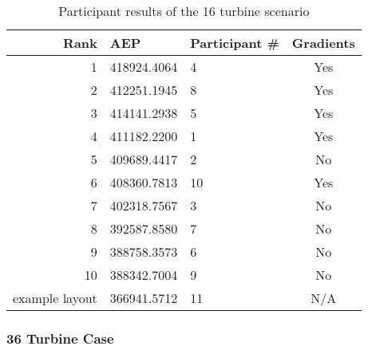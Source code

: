 	\begin{table}[H]
		\begin{center}
			\begin{tabular}{r l l c}
				\hline
				Rank           & AEP         & Participant \# & Gradients \\
				\hline
				1              & 418924.4064 & 4              & Yes       \\
				2              & 412251.1945 & 8              & Yes       \\
				3              & 414141.2938 & 5              & Yes       \\
				4              & 411182.2200 & 1              & Yes       \\
				5              & 409689.4417 & 2              & No        \\
				6              & 408360.7813 & 10             & Yes       \\
				7              & 402318.7567 & 3              & No        \\
				8              & 392587.8580 & 7              & No        \\
				9              & 388758.3573 & 6              & No        \\
				10             & 388342.7004 & 9              & No        \\
				example layout & 366941.5712 & 11             & N/A       \\
				\hline
			\end{tabular}
		\end{center}
		\caption{Participant results of the 16 turbine scenario}
		\label{tab:results}
	\end{table}

\subsubsection{36 Turbine Case}


